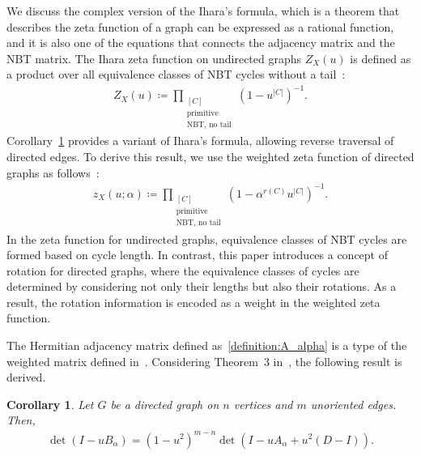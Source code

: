 \documentclass{article}
\theoremstyle{plain}
\newtheorem{corollary}{Corollary}
\begin{document}
We discuss the complex version of the Ihara's formula, which is a theorem that describes the zeta function of a graph can be expressed as a rational function, and it is also one of the equations that connects the adjacency matrix and the NBT matrix.
The Ihara zeta function on undirected graphs $Z_X(u)$ is defined as a product over all equivalence classes of NBT cycles without a tail~\citep{Stark1996-mx}:
\begin{align*}
	Z_{X}(u) \coloneqq \prod_{\substack{[C] \\\text{primitive}\\\text{NBT, no tail}}} (1 - u^{\left| C \right|})^{-1}
	.
\end{align*}
Corollary~\ref{corollary:ihara_formula} provides a variant of Ihara's formula, allowing reverse traversal of directed edges.
To derive this result, we use the weighted zeta function of directed graphs as follows~\citep{Konno2019-jd}:
\begin{align*}
	z_{X}(u; \alpha) \coloneqq \prod_{\substack{[C] \\\text{primitive}\\\text{NBT, no tail}}} (1 - \alpha^{r(C)} u^{\left| C \right|})^{-1}
	.
\end{align*}
In the zeta function for undirected graphs, equivalence classes of NBT cycles are formed based on cycle length.
In contrast, this paper introduces a concept of rotation for directed graphs, where the equivalence classes of cycles are determined by considering not only their lengths but also their rotations.
As a result, the rotation information is encoded as a weight in the weighted zeta function.

The Hermitian adjacency matrix defined as~\eqref{definition:A_alpha} is a type of the weighted matrix defined in~\citep{Konno2019-jd}.
Considering Theorem~3 in~\citep{Konno2019-jd}, the following result is derived.

\begin{corollary}\label{corollary:ihara_formula}
	Let $G$ be a directed graph on $n$ vertices and $m$ unoriented edges. Then,
	\begin{align*}
		\det (I-u B_{\alpha}) = (1-u^2)^{m-n} \det \left( I - u A_{\alpha} + u^2 (D - I) \right)
		.
	\end{align*}
\end{corollary}
\end{document}
